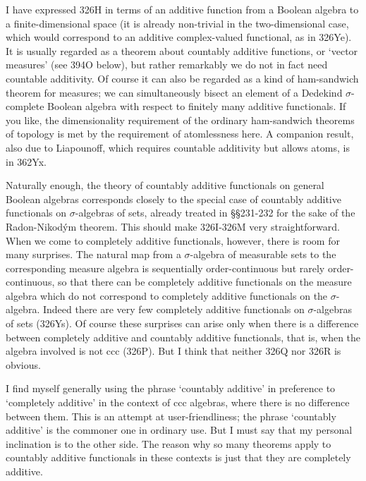 {I have expressed 326H in terms of an additive function from a Boolean
algebra to a finite-dimensional space (it is already non-trivial in the
two-dimensional case, which would correspond to an additive complex-valued
functional, as in 326Ye).
It is usually regarded as a theorem about countably additive
functions, or `vector measures' (see 394O below), but rather remarkably we
do not in fact need countable additivity.   Of course it can also be
regarded as a kind of ham-sandwich theorem for measures;  we can
simultaneously bisect an element of a Dedekind $\sigma$-complete Boolean
algebra with respect to finitely many additive functionals.   If you like,
the dimensionality requirement of the ordinary ham-sandwich theorems of
topology is met by the requirement of atomlessness here.   A companion
result, also due to Liapounoff,
which requires countable additivity but allows atoms, is in 362Yx.

Naturally enough, the theory of countably additive functionals on
general Boolean algebras corresponds closely to the special case of
countably additive functionals on $\sigma$-algebras of sets, already
treated in \S\S231-232 for the sake of the Radon-Nikod\'ym theorem.
This should make 326I-326M very straightforward.
When we come to completely additive functionals, however, there is room
for many surprises.   The natural map from a $\sigma$-algebra of
measurable sets to the corresponding measure algebra is sequentially
order-continuous but rarely order-continuous, so that there can be
completely additive functionals on the measure algebra which do not
correspond to completely additive functionals on the $\sigma$-algebra.
Indeed there are very few completely additive functionals on
$\sigma$-algebras of sets (326Ys).   Of course these surprises can arise
only when there is a difference between completely additive and
countably additive functionals, that is, when the algebra involved is
not ccc (326P).   But I think that neither 326Q nor 326R is obvious.

I find myself generally using the phrase `countably additive' in
preference to `completely additive' in the context of ccc algebras,
where there is no difference between them.   This is an attempt at
user-friendliness;  the phrase `countably additive' is the commoner one
in ordinary use.   But I must say that my personal inclination is to the
other side.   The reason why so many theorems apply to countably
additive functionals in these contexts is just that they are
completely additive.

}
